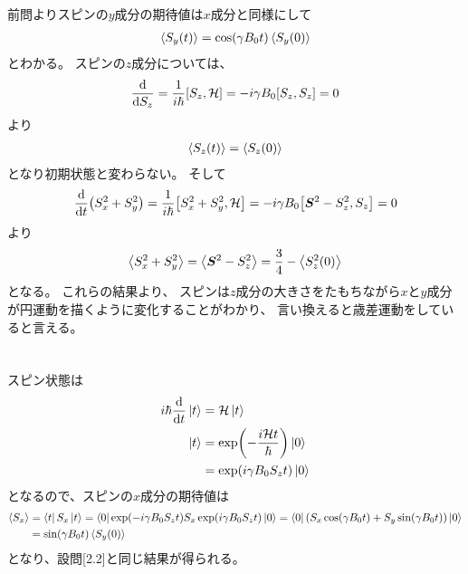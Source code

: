 \documentclass[../ap_2010.tex]{subfiles}
\begin{document}
\subsection{}
前問よりスピンの\(y\)成分の期待値は\(x\)成分と同様にして
\begin{equation}\begin{aligned}[b]
    \ev{S_y(t)}=\cos(\gamma B_0t)\ev{S_y(0)}
\end{aligned}\end{equation}
とわかる。
スピンの\(z\)成分については、
\begin{equation}\begin{aligned}[b]
    \dv{S_z} = \frac{1}{i\hbar}\qty[S_z,\mathcal{H}]=-i\gamma B_0\qty[S_z,S_z]=0
\end{aligned}\end{equation}
より
\begin{equation}\begin{aligned}[b]
    \ev{S_z(t)}=\ev{S_z(0)}
\end{aligned}\end{equation}
となり初期状態と変わらない。
そして
\begin{equation}\begin{aligned}[b]
    \dv{t}\qty(S_x^2+S_y^2) = \frac{1}{i\hbar}\qty[S_x^2+S_y^2,\mathcal{H}]
    =-i\gamma B_0\qty[\vb*{S}^2-S_z^2,S_z]=0
\end{aligned}\end{equation}
より
\begin{equation}\begin{aligned}[b]
    \ev{S_x^2+S_y^2}=\ev{\vb*{S}^2-S_z^2}=\frac{3}{4}-\ev{S_z^2(0)}
\end{aligned}\end{equation}
となる。
これらの結果より、
スピンは\(z\)成分の大きさをたもちながら\(x\)と\(y\)成分が円運動を描くように変化することがわかり、
言い換えると歳差運動をしていると言える。

\section{}
\subsection{}
スピン状態は
\begin{equation}\begin{aligned}[b]
    i\hbar\dv{t}\ket{t}&=\mathcal{H}\ket{t}\\
    \ket{t} &= \exp(-\frac{i\mathcal{H}t}{\hbar})\ket{0}\\
    &= \exp(i\gamma B_0 S_zt)\ket{0}
\end{aligned}\end{equation}
となるので、スピンの\(x\)成分の期待値は
\begin{equation}\begin{aligned}[b]
    \ev{S_x} &= \bra{t}S_x\ket{t}
    = \bra{0}\exp(-i\gamma B_0 S_zt)S_x\exp(i\gamma B_0 S_zt)\ket{0}
    =\bra{0}\qty(S_x\cos(\gamma B_0t)+S_y\sin(\gamma B_0t))\ket{0}\\
    &= \sin(\gamma B_0t)\ev{S_y(0)}
\end{aligned}\end{equation}
となり、設問[2.2]と同じ結果が得られる。
\end{document}
